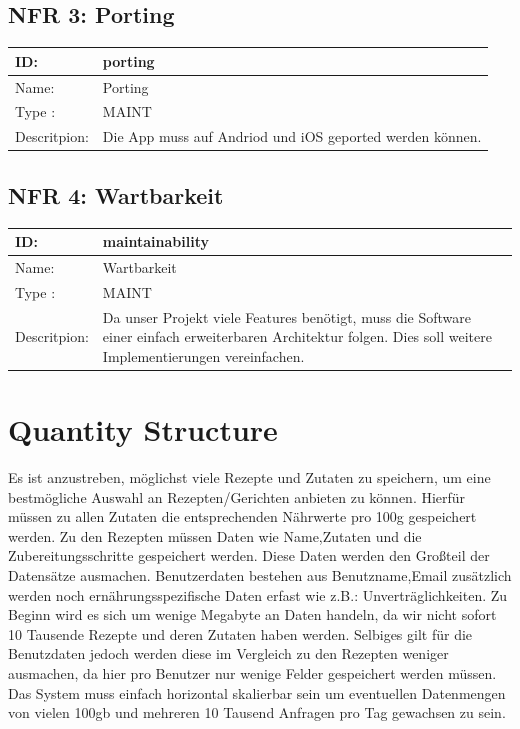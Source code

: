 \documentclass[12pt]{article}
\theoremstyle{definition}
\begin{document}
\subsection{NFR 3: Porting }
\begin{tabular}{|p{.2\linewidth}|p{.65\linewidth}|}
\hline 
ID: &  porting\\ \hline
Name: & Porting \\ \hline
Type	: & MAINT \\ \hline
Descritpion: & Die App muss auf Andriod und iOS geported werden können.  \\ \hline
\end{tabular}

\subsection{NFR 4: Wartbarkeit }
\begin{tabular}{|p{.2\linewidth}|p{.65\linewidth}|}
\hline 
ID: &  maintainability\\ \hline
Name: & Wartbarkeit \\ \hline
Type	: & MAINT \\ \hline
Descritpion: & Da unser Projekt viele Features benötigt, muss die Software einer einfach erweiterbaren Architektur folgen. Dies soll weitere Implementierungen vereinfachen. \\ \hline
\end{tabular}

\pagebreak

\section{Quantity Structure}
Es ist anzustreben, möglichst viele Rezepte und Zutaten zu speichern, um eine bestmögliche Auswahl an Rezepten/Gerichten anbieten zu können. Hierfür müssen zu allen Zutaten die entsprechenden Nährwerte pro 100g gespeichert werden. Zu den Rezepten müssen Daten wie Name,Zutaten und die Zubereitungsschritte gespeichert werden. Diese Daten werden den Großteil der Datensätze ausmachen. Benutzerdaten bestehen aus Benutzname,Email zusätzlich werden noch ernährungsspezifische Daten erfast wie z.B.: Unverträglichkeiten. Zu Beginn wird es sich um wenige Megabyte an Daten handeln, da wir nicht sofort 10 Tausende Rezepte und deren Zutaten haben werden. Selbiges gilt für die Benutzdaten jedoch werden diese im Vergleich zu den Rezepten weniger ausmachen, da hier pro Benutzer nur wenige Felder gespeichert werden müssen. Das System muss einfach horizontal skalierbar sein um eventuellen Datenmengen von vielen 100gb und mehreren 10 Tausend Anfragen pro Tag gewachsen zu sein.
\end{document}

